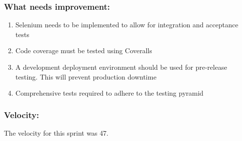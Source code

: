 \documentclass[10pt,onecolumn]{witseiepaper}
\begin{document}
\subsubsection*{What needs improvement:}
\begin{enumerate}
	\item Selenium needs to be implemented to allow for integration and acceptance tests
	\item Code coverage must be tested using Coveralls
	\item A development deployment environment should be used for pre-release testing. This will prevent production downtime
	\item Comprehensive tests required to adhere to the testing pyramid
\end{enumerate}

\subsubsection*{Velocity:}
The velocity for this sprint was 47. 
\end{document}
